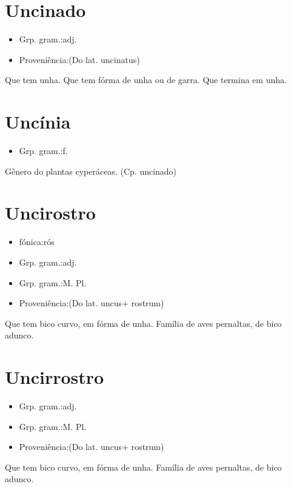 \documentclass{article}
\begin{document}
\section{Uncinado}
\begin{itemize}
\item {Grp. gram.:adj.}
\end{itemize}
\begin{itemize}
\item {Proveniência:(Do lat. \textunderscore uncinatus\textunderscore )}
\end{itemize}
Que tem unha.
Que tem fórma de unha ou de garra.
Que termina em unha.
\section{Uncínia}
\begin{itemize}
\item {Grp. gram.:f.}
\end{itemize}
Gênero do plantas cyperáceas.
(Cp. \textunderscore uncinado\textunderscore )
\section{Uncirostro}
\begin{itemize}
\item {fónica:rós}
\end{itemize}
\begin{itemize}
\item {Grp. gram.:adj.}
\end{itemize}
\begin{itemize}
\item {Grp. gram.:M. Pl.}
\end{itemize}
\begin{itemize}
\item {Proveniência:(Do lat. \textunderscore uncus\textunderscore  + \textunderscore rostrum\textunderscore )}
\end{itemize}
Que tem bico curvo, em fórma de unha.
Família de aves pernaltas, de bico adunco.
\section{Uncirrostro}
\begin{itemize}
\item {Grp. gram.:adj.}
\end{itemize}
\begin{itemize}
\item {Grp. gram.:M. Pl.}
\end{itemize}
\begin{itemize}
\item {Proveniência:(Do lat. \textunderscore uncus\textunderscore  + \textunderscore rostrum\textunderscore )}
\end{itemize}
Que tem bico curvo, em fórma de unha.
Família de aves pernaltas, de bico adunco.
\end{document}
